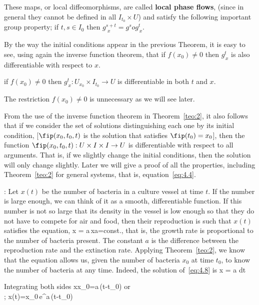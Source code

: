 These maps, or local diffeomorphisms, are called 
{\bf local phase flows}, 
(since in general they cannot be
defined in all $I_{t_0}\times U$) and satisfy the following
important group property; if $t,s \in I_0$ then
$g^{s+t}_{\,\,x}=g^s o g^t_{\,x}$.


By the way the initial conditions appear in the previous Theorem,
it is easy to see, using again the inverse function theorem, 
that if $f(x_0)\neq 0$ then $g^t_{\,x}$ is also differentiable 
with respect to $x$.

\begin{cor} if $f(x_0)\neq 0$ then
$g^t_{\,x}:U_{x_0}\times I_{t_0}\to U$ is differentiable in both $t$ and
$x$.
\label{cor1}
\end{cor}
 The restriction $f(x_0)\neq 0$ is
unnecessary as we will see later.
\espa

From the use of the inverse function theorem in Theorem~\ref{teo:2}, it also
follows that if we consider the set of solutions distinguishing
each one by its initial condition,
[$\fip(x_0,t_0,t)$ is the solution that satisfies $\fip(t_0)=x_0$],
then the function $\fip(x_0,t_0,t):U\times I\times I\to U$ is
differentiable with respect to all arguments. That is, if
we slightly change the initial conditions, then the solution
will only change slightly. Later we will give a proof of all
the properties, including Theorem~\ref{teo:2} for general systems,
that is, equation~\ref{eq:4.4}.
\espa


\ejem:
Let $x(t)$ be the number of bacteria in a culture vessel at time $t$. If the number is large enough, we can think of it as a smooth, differentiable function. If this number is not so large that its density in the vessel is low enough so that they do not have to compete for air and food, then their reproduction is such that $x(t)$ satisfies the equation,
\beq
\dot x = a\,x\;\;\;\;\;\;a=\mbox{const.},
\label{eq:4.8}
\eeq
that is, the growth rate is proportional to the number of bacteria present. The constant $a$ is the difference between the reproduction rate and the extinction rate. Applying Theorem~\ref{teo:2}, we know that the equation allows us, given the number of bacteria $x_0$ at time $t_0$, to know the number of bacteria at any time. Indeed, the solution of~\ref{eq:4.8} is 
\beq 
{}x = a\,\,dt
\eeq 

\noi Integrating both sides
\beq 
\ln \frac x{x_0}=a\,(t-t_0) \;\;\;\mbox{or}\\;\;\;
x(t)=x_0\,\mbox{e}^{a\,(t-t_0)} 
\eeq 

